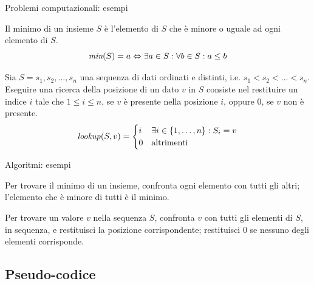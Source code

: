 \begin{frame}{Problemi computazionali: esempi}

\vspace{-9pt}
\begin{myboxtitle}
Il minimo di un insieme $S$ è l'elemento di $S$ che è minore o uguale ad ogni elemento di $S$.
\[
  \textit{min}(S) = a \Leftrightarrow \exists a \in S: \forall b \in S : a \leq b
\]
\end{myboxtitle}

\begin{myboxtitle}
Sia $S=s_1, s_2, \ldots, s_n$ una sequenza di dati ordinati e distinti, i.e.  $s_1 < s_2 < \ldots < s_n$. 
Eseguire una ricerca della posizione di un dato $v$ in $S$ consiste nel restituire un indice $i$ tale che 
$1 \leq i \leq n$, se $v$ è presente nella posizione $i$, oppure $0$, se $v$ non è presente.
\[
 \mathit{lookup}(S, v) = \begin{cases}
  i & \exists i \in \{1, \ldots, n\}: S_i = v \\
  0 & \textrm{altrimenti}
  \end{cases}
\]
\end{myboxtitle}

\end{frame}

\begin{frame}{Algoritmi: esempi}

\vspace{-9pt}
\begin{myboxtitle}
Per trovare il minimo di un insieme, confronta ogni elemento con tutti gli
altri; l’elemento che è minore di tutti è il minimo.
\end{myboxtitle}


\begin{myboxtitle}
Per trovare un valore $v$ nella sequenza $S$, confronta $v$ con tutti gli elementi di $S$, 
in sequenza, e restituisci la posizione corrispondente; restituisci $0$ 
se nessuno degli elementi corrisponde.
\end{myboxtitle}

\end{frame}

\subsection{Pseudo-codice}

